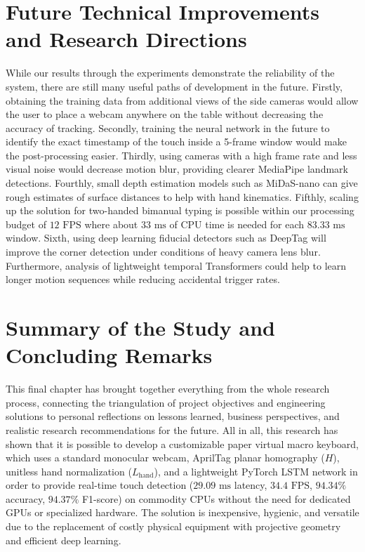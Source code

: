 \section{Future Technical Improvements and Research Directions}
\label{sec:concl_future}
While our results through the experiments demonstrate the reliability of the system, there are still many useful paths of development in the future. Firstly, obtaining the training data from additional views of the side cameras would allow the user to place a webcam anywhere on the table without decreasing the accuracy of tracking. Secondly, training the neural network in the future to identify the exact timestamp of the touch inside a 5-frame window would make the post-processing easier. Thirdly, using cameras with a high frame rate and less visual noise would decrease motion blur, providing clearer MediaPipe landmark detections. Fourthly, small depth estimation models such as MiDaS-nano can give rough estimates of surface distances to help with hand kinematics. Fifthly, scaling up the solution for two-handed bimanual typing is possible within our processing budget of $12\text{ FPS}$ where about $33\text{ ms}$ of CPU time is needed for each $83.33\text{ ms}$ window. Sixth, using deep learning fiducial detectors such as DeepTag \cite{Zhang2022DeepTag} will improve the corner detection under conditions of heavy camera lens blur. Furthermore, analysis of lightweight temporal Transformers could help to learn longer motion sequences while reducing accidental trigger rates.


\section{Summary of the Study and Concluding Remarks}
\label{sec:concl_summary}
This final chapter has brought together everything from the whole research process, connecting the triangulation of project objectives and engineering solutions to personal reflections on lessons learned, business perspectives, and realistic research recommendations for the future. All in all, this research has shown that it is possible to develop a customizable paper virtual macro keyboard, which uses a standard monocular webcam, AprilTag planar homography ($H$), unitless hand normalization ($L_{\text{hand}}$), and a lightweight PyTorch LSTM network in order to provide real-time touch detection ($29.09\text{ ms}$ latency, $34.4\text{ FPS}$, $94.34\%$ accuracy, $94.37\%$ F1-score) on commodity CPUs without the need for dedicated GPUs or specialized hardware. The solution is inexpensive, hygienic, and versatile due to the replacement of costly physical equipment with projective geometry and efficient deep learning.
